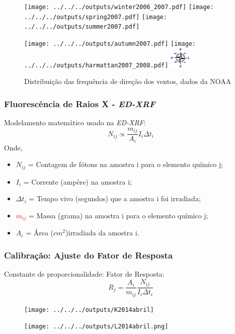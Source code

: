 \begin{frame}
  \frametitle{}
  \begin{figure}[H]
    \centering
      \texttt{[image: ../../../outputs/winter2006\_2007.pdf]}
      \texttt{[image: ../../../outputs/spring2007.pdf]}
      \texttt{[image: ../../../outputs/summer2007.pdf]}
  \end{figure}

  \begin{figure}[H]
    \centering
      \texttt{[image: ../../../outputs/autumn2007.pdf]}
      \texttt{[image: ../../../outputs/harmattan2007\_2008.pdf]}
      \includegraphics[width=1cm]{../../../inputs/images/rosa_ventos}
      \caption{Distribuição das frequência de direção dos ventos, dados da NOAA}
  \end{figure}
\end{frame}

\begin{frame}
  \frametitle{Fluorescência de Raios X - \textit{ED-XRF}}
  Modelamento matemático usado na \textit{ED-XRF}:
  \begin{equation}
	  N_{ij} \propto \frac{m_{ij}}{A_i}I_i{\Delta}t_{i}
  \end{equation}
  Onde,  
  \begin{itemize}
    \item $N_{ij}$ = Contagem de fótons na amostra i para o elemento químico j;
    \item $I_{i}$ = Corrente (ampère) na amostra i;
    \item $\Delta t_i$ = Tempo vivo (segundos) que a amostra i foi irradiada;
    \item \textcolor{red}{$m_{ij}$} = Massa (grama) na amostra i para o elemento químico j;
    \item $A_i$ = Área ($cm^2$)irradiada da amostra i.
  \end{itemize}
\end{frame}

\begin{frame}
  \frametitle{Calibração: Ajuste do Fator de Resposta}
  Constante de proporcionalidade: Fator de Resposta:
  \begin{equation}
    R_j = \frac{A_i}{m_{ij}} \frac{N_{ij}}{I_i \Delta t_i}
  \end{equation}
  \begin{figure}[H]
  \centering
    \begin{minipage}[b]{0.40\linewidth}
      \texttt{[image: ../../../outputs/K2014abril]}
    \end{minipage}
    \quad
    \begin{minipage}[b]{0.40\linewidth}
      \texttt{[image: ../../../outputs/L2014abril.png]}
    \end{minipage}
  \end{figure}
\end{frame}

